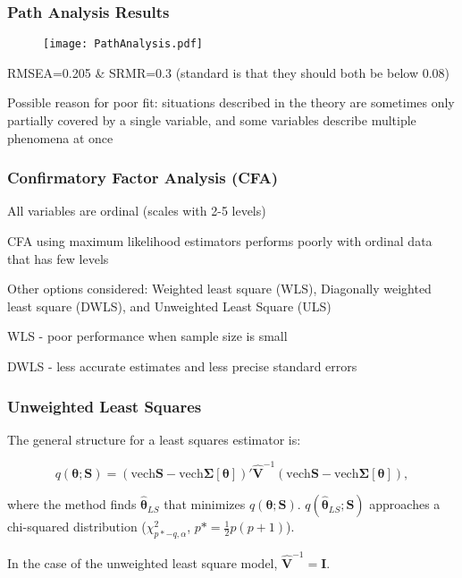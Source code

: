 \documentclass{beamer}
\begin{document}
\begin{frame}
\frametitle{Path Analysis Results}
\begin{figure}
\centering
  \texttt{[image: PathAnalysis.pdf]}
  \label{fig:path}
\end{figure}
\tiny
RMSEA=0.205 \& SRMR=0.3 (standard is that they should both be below 0.08)
\itemize
\footnotesize
\item Possible reason for poor fit: situations described in the theory are sometimes only partially covered by a single variable, and some variables describe multiple phenomena at once
\end{frame}

\begin{frame}
\frametitle{Confirmatory Factor Analysis (CFA)}
\itemize
\item All variables are ordinal (scales with 2-5 levels)
\item CFA using maximum likelihood estimators performs poorly with ordinal data that has few levels
\item Other options considered: Weighted least square (WLS), Diagonally weighted least square (DWLS), and Unweighted Least Square (ULS)
\item WLS  - poor performance when sample size is small
\item DWLS - less accurate estimates and less precise standard errors
\end{frame}

\begin{frame}
\frametitle{Unweighted Least Squares}
The general structure for a least squares estimator is:

\begin{equation}
q(\boldsymbol{\theta};\mathbf{S}) = (\text{vech} \mathbf{S} - \text{vech} \boldsymbol{\Sigma}[\boldsymbol{\theta}])' \hat{\mathbf{V}}^{-1}(\text{vech} \mathbf{S} - \text{vech} \boldsymbol{\Sigma}[\boldsymbol{\theta}]),
\end{equation}

where the method finds $\hat{\boldsymbol{\theta}}_{LS}$ that minimizes $q(\boldsymbol{\theta};\mathbf{S})$. $q(\hat{\boldsymbol{\theta}}_{LS};\mathbf{S})$ approaches a chi-squared distribution ($\chi^2_{p*-q,\alpha}$, $p*=\frac{1}{2}p(p+1)$). 

In the case of the unweighted least square model, $\hat{\mathbf{V}}^{-1}=\mathbf{I}$.
\end{frame}
\end{document}

